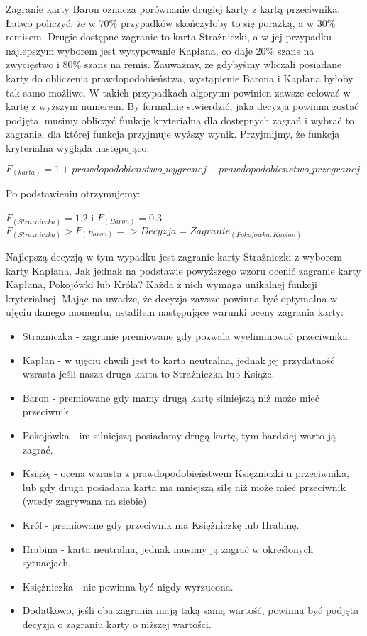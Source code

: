 Zagranie karty Baron oznacza porównanie drugiej karty z kartą przeciwnika. Łatwo policzyć, że w 70\% przypadków skończyłoby to się porażką, a w 30\% remisem. Drugie dostępne zagranie to karta Strażniczki, a w jej przypadku najlepszym wyborem jest wytypowanie Kapłana, co daje 20\% szans na zwycięstwo i 80\% szans na remis. Zauważmy, że gdybyśmy wliczali posiadane karty do obliczenia prawdopodobieństwa, wystąpienie Barona i Kapłana byłoby tak samo możliwe. W takich przypadkach algorytm powinien zawsze celować w kartę z wyższym numerem. By formalnie stwierdzić, jaka decyzja powinna zostać podjęta, musimy obliczyć funkcję kryterialną dla dostępnych zagrań i wybrać to zagranie, dla której funkcja przyjmuje wyższy wynik. Przyjmijmy, że funkcja kryterialna wygląda następująco:

\begin{center}
	$F_{(karta)} = 1 + prawdopodobienstwo\_wygranej - prawdopodobienstwo\_przegranej$
\end{center}
Po podstawieniu otrzymujemy:
\begin{center}
 $F_{(Strazniczka)}=1.2$ i $F_{(Baron)} = 0.3$
 \\
 $F_{(Strazniczka)}>F_{(Baron)} => Decyzja=Zagranie_{(Pokojowka, Kaplan)}$ 
 \end{center} 

Najlepszą decyzją w tym wypadku jest zagranie karty Strażniczki z wyborem karty Kapłana. Jak jednak na podstawie powyższego wzoru ocenić zagranie karty Kapłana, Pokojówki lub Króla? Każda z nich wymaga unikalnej funkcji kryterialnej. Mając na uwadze, że decyzja zawsze powinna być optymalna w ujęciu danego momentu, ustaliłem następujące warunki oceny zagrania karty:
\begin{itemize}
	\item Strażniczka - zagranie premiowane gdy pozwala wyeliminować przeciwnika.
	\item Kapłan - w ujęciu chwili jest to karta neutralna, jednak jej przydatność wzrasta jeśli nasza druga karta to Strażniczka lub Książe.
	\item Baron - premiowane gdy mamy drugą kartę silniejszą niż może mieć przeciwnik.
	\item Pokojówka - im silniejszą posiadamy drugą kartę, tym bardziej warto ją zagrać.
	\item Książę - ocena wzrasta z prawdopodobieństwem Księżniczki u przeciwnika, lub gdy druga posiadana karta ma mniejszą siłę niż może mieć przeciwnik (wtedy zagrywana na siebie)
	\item Król - premiowane gdy przeciwnik ma Księżniczkę lub Hrabinę.
	\item Hrabina - karta neutralna, jednak musimy ją zagrać w określonych sytuacjach.
	\item Księżniczka - nie powinna być nigdy wyrzucona.
	\item Dodatkowo, jeśli oba zagrania mają taką samą wartość, powinna być podjęta decyzja o zagraniu karty o niższej wartości.
\end{itemize}

